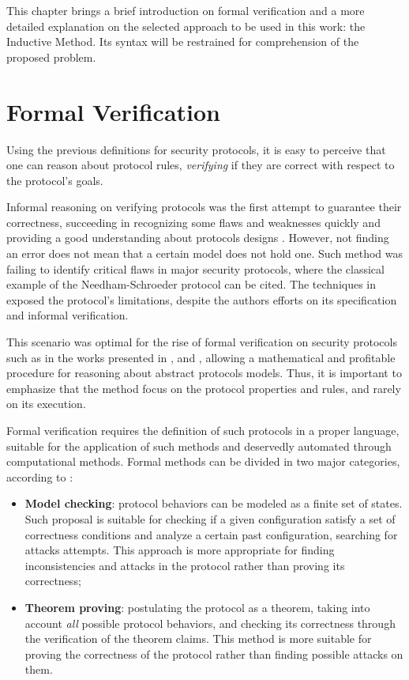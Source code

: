 \label{chap:inductive}
This chapter brings a brief introduction on formal verification and a more detailed explanation on the selected approach to be used in this work: the Inductive Method. Its syntax will be restrained for comprehension of the proposed problem.

\section{Formal Verification}
Using the previous definitions for security protocols, it is easy to perceive that one can reason about protocol rules, \textit{verifying} if they are correct with respect to the protocol's goals.

Informal reasoning on verifying protocols was the first attempt to guarantee their correctness, succeeding in recognizing some flaws and weaknesses quickly and providing a good understanding about protocols designs \cite{bella-book}. However, not finding an error does not mean that a certain model does not hold one. Such method was failing to identify critical flaws in major security protocols, where the classical example of the Needham-Schroeder protocol \cite{needham-schroeder} can be cited. The techniques in \cite{lowe96} exposed the protocol's limitations, despite the authors efforts on its specification and informal verification.

This scenario was optimal for the rise of formal verification on security protocols such as in the works presented in \cite{meadows-old-survey}, \cite{kemmerer-verification} and \cite{ban}, allowing a mathematical and profitable procedure for reasoning about abstract protocols models. Thus, it is important to emphasize that the method focus on the protocol properties and rules, and rarely on its execution.

Formal verification requires the definition of such protocols in a proper language, suitable for the application of such methods and deservedly automated through computational methods. Formal methods can be divided in two major categories, according to \cite{boyd-mathuria}:

\begin{itemize}
  \item \textbf{Model checking}: protocol behaviors can be modeled as a finite set of states. Such proposal is suitable for checking if a given configuration satisfy a set of correctness conditions and analyze a certain past configuration, searching for attacks attempts. This approach is more appropriate for finding inconsistencies and attacks in the protocol rather than proving its correctness;

  \item \textbf{Theorem proving}: postulating the protocol as a theorem, taking into account \textit{all} possible protocol behaviors, and checking its correctness through the verification of the theorem claims. This method is more suitable for proving the correctness of the protocol rather than finding possible attacks on them.
\end{itemize}


